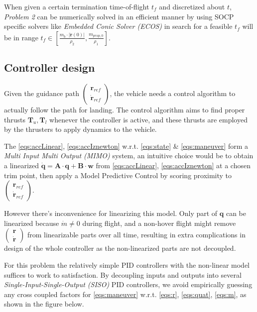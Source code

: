 \documentclass[10pt]{elsarticle}
\begin{document}
When given a certain termination time-of-flight $t_f$ and discretized about $t$, \textit{Problem 2} can be numerically solved in an efficient manner by using SOCP specific solvers like \textit{Embedded Conic Solver (ECOS)}\cite{domahidi2013ecos} in search for a feasible $t_f$ will be in range $t_f \in [\frac{m_b \cdot |\dot{\boldsymbol{r}}(0)|}{\rho_2}, \frac{m_{prop,0}}{\rho_1}]$.

\subsection{Controller design} \label{sec:controllerdesign}

Given the guidance path $\begin{pmatrix} \boldsymbol{r}_{ref} \\ \dot{\boldsymbol{r}}_{ref} \end{pmatrix}$, the vehicle needs a control algorithm to actually follow the path for landing. The control algorithm aims to find proper thrusts $\boldsymbol{T}_{u}, \boldsymbol{T}_{l}$ whenever the controller is active, and these thrusts are employed by the thrusters to apply dynamics to the vehicle.     

The \eqref{eqs:accLinear}, \eqref{eqs:accIznewton} w.r.t. \eqref{eqs:state} \& \eqref{eqs:maneuver} form a \textit{Multi Input Multi Output (MIMO)} system, an intuitive choice would be to obtain a linearized $\boldsymbol{\dot{q}} = \boldsymbol{A} \cdot \boldsymbol{q} + \boldsymbol{B} \cdot \boldsymbol{w}$ from \eqref{eqs:accLinear}, \eqref{eqs:accIznewton} at a chosen trim point, then apply a Model Predictive Control by scoring proximity to $\begin{pmatrix} \boldsymbol{r}_{ref} \\ \dot{\boldsymbol{r}}_{ref} \end{pmatrix}$. 

However there's inconvenience for linearizing this model. Only part of $\boldsymbol{q}$ can be linearized because $\dot{m} \ne 0$ during flight, and a non-hover flight might remove $\begin{pmatrix} \boldsymbol{r} \\ \dot{\boldsymbol{r}} \end{pmatrix}$ from linearizable parts over all time\cite{kim2020modeling}, resulting in extra complications in design of the whole controller as the non-linearized parts are not decoupled.     

For this problem the relatively simple PID controllers with the non-linear model suffices to work to satisfaction. By decoupling inputs and outputs into several \textit{Single-Input-Single-Output (SISO)} PID controllers, we avoid empirically guessing any cross coupled factors for \eqref{eqs:maneuver} w.r.t. \eqref{eqs:r}, \eqref{eqs:quat}, \eqref{eqs:m}, as shown in the figure below.
\end{document}
